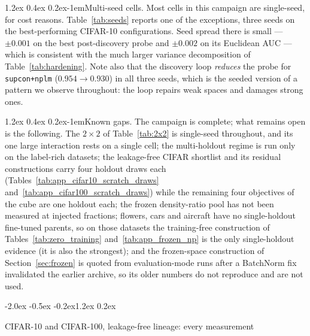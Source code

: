 \documentclass{article}
\makeatletter
\renewcommand\section{\@startsection{section}{1}{\z@}%
  {-2.0ex \@plus -0.5ex \@minus -0.2ex}{1.2ex \@plus 0.2ex}%
  {\large\bf\raggedright}}
\renewcommand\paragraph{\@startsection{paragraph}{4}{\z@}%
  {1.2ex \@plus 0.4ex \@minus 0.2ex}{-1em}{\normalsize\bf}}
\makeatother
\begin{document}
\paragraph{Multi-seed cells.}
Most cells in this campaign are single-seed, for cost reasons.
Table~\ref{tab:seeds} reports one of the exceptions, three seeds on the
best-performing CIFAR-10 configurations. Seed spread there is small --- $\pm0.001$ on the best
post-discovery probe and $\pm0.002$ on its Euclidean AUC --- which is
consistent with the much larger variance decomposition of
Table~\ref{tab:hardening}. Note also that the discovery loop \emph{reduces}
the probe for \texttt{supcon+nplm} ($0.954 \to 0.930$) in all three seeds,
which is the seeded version of a pattern we observe throughout: the loop
repairs weak spaces and damages strong ones.

\paragraph{Known gaps.} The campaign is complete; what remains open is the
following. The $2\times2$ of
Table~\ref{tab:2x2} is single-seed throughout, and its one large interaction
rests on a single cell; the multi-holdout regime is run only on the
label-rich datasets; the leakage-free CIFAR shortlist and its residual
constructions carry four holdout draws each
(Tables~\ref{tab:app_cifar10_scratch_draws}
and~\ref{tab:app_cifar100_scratch_draws}) while the remaining four
objectives of the cube are one holdout each; the frozen density-ratio pool
has not been measured at injected fractions; flowers, cars and aircraft have no
single-holdout fine-tuned parents, so on those datasets the training-free
construction of Tables~\ref{tab:zero_training} and~\ref{tab:app_frozen_np}
is the only single-holdout evidence (it is also the strongest); and
the frozen-space construction of Section~\ref{sec:frozen} is quoted from
evaluation-mode runs after a BatchNorm fix invalidated the earlier archive,
so its older numbers do not reproduce and are not used.









%


\section{CIFAR-10 and CIFAR-100, leakage-free lineage: every measurement}
\label{sec:app_cifar}
\end{document}
